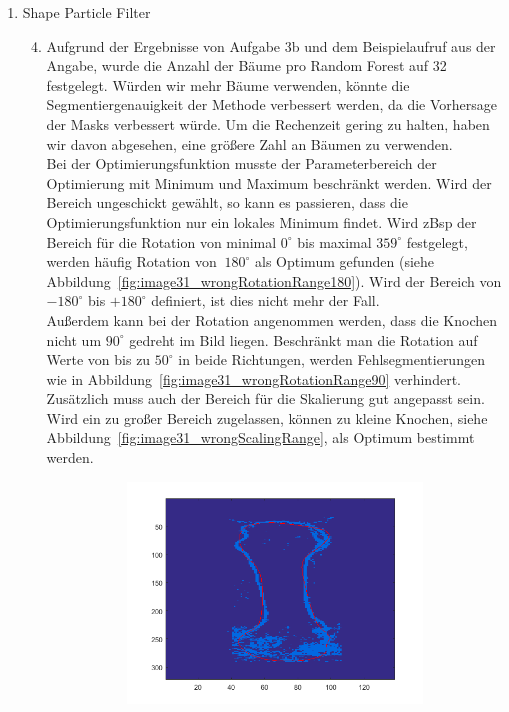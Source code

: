 \documentclass[]{report}
\begin{document}
\begin{enumerate}
		\item Shape Particle Filter
			\begin{enumerate}
				\setcounter{enumii}{3}
				\item
				Aufgrund der Ergebnisse von Aufgabe 3b und dem Beispielaufruf aus der Angabe, wurde die Anzahl der Bäume pro Random Forest auf 32 festgelegt. Würden wir mehr Bäume verwenden, könnte die Segmentiergenauigkeit der Methode verbessert werden, da die Vorhersage der Masks verbessert würde. Um die Rechenzeit gering zu halten, haben wir davon abgesehen, eine größere Zahl an Bäumen zu verwenden.\\
				Bei der Optimierungsfunktion musste der Parameterbereich der Optimierung mit Minimum und Maximum beschränkt werden. Wird der Bereich ungeschickt gewählt, so kann es passieren, dass die Optimierungsfunktion nur ein lokales Minimum findet. Wird zBsp der Bereich für die Rotation von minimal $0^\circ$ bis maximal $359^\circ$ festgelegt, werden häufig Rotation von $~180^\circ$ als Optimum gefunden (siehe Abbildung~\ref{fig:image31_wrongRotationRange180}).
				Wird der Bereich von $-180^\circ$ bis $+180^\circ$ definiert, ist dies nicht mehr der Fall.\\
				Außerdem kann bei der Rotation angenommen werden, dass die Knochen nicht um $90^\circ$ gedreht im Bild liegen. Beschränkt man die Rotation auf Werte von bis zu $50^\circ$ in beide Richtungen, werden Fehlsegmentierungen %
				wie in Abbildung~\ref{fig:image31_wrongRotationRange90}	verhindert.\\
				Zusätzlich muss auch der Bereich für die Skalierung gut angepasst sein. Wird ein zu großer Bereich zugelassen, können zu kleine Knochen, siehe Abbildung~\ref{fig:image31_wrongScalingRange}, als Optimum bestimmt werden.\\
				\begin{figure}
					\begin{subfigure}[t]{0.3\textwidth}
						\centering
						\includegraphics[width=\textwidth]{figures/image31_wrongRotationRange180.png}

\end{subfigure}
\end{figure}
\end{enumerate}
\end{enumerate}
\end{document}
